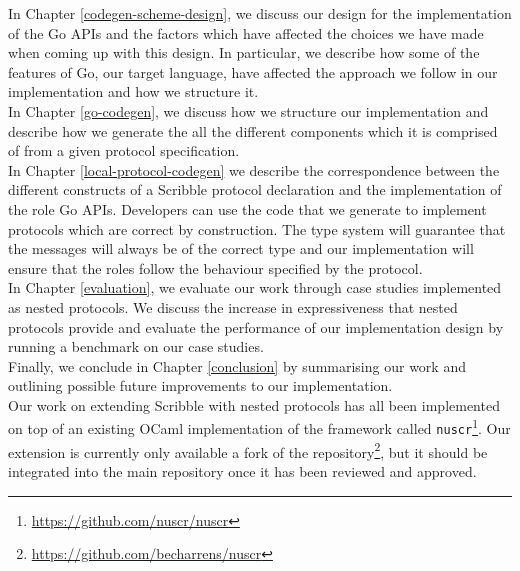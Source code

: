 \documentclass[12pt,twoside]{report}
\begin{document}
In Chapter \ref{codegen-scheme-design}, we discuss our design for the implementation of the Go APIs and the factors which have affected the choices we have made when coming up with this design. In particular, we describe how some of the features of Go, our target language, have affected the approach we follow in our implementation and how we structure it.\\

In Chapter \ref{go-codegen}, we discuss how we structure our implementation and describe how we generate the all the different components which it is comprised of from a given protocol specification.\\

In Chapter \ref{local-protocol-codegen} we describe the correspondence between the different constructs of a Scribble protocol declaration and the implementation of the role Go APIs. Developers can use the code that we generate to implement protocols which are correct by construction. The type system will guarantee that the messages will always be of the correct type and our implementation will ensure that the roles follow the behaviour specified by the protocol.\\

In Chapter \ref{evaluation}, we evaluate our work through case studies implemented as nested protocols. We discuss the increase in expressiveness that nested protocols provide and evaluate the performance of our implementation design by running a benchmark on our case studies.\\

Finally, we conclude in Chapter \ref{conclusion} by summarising our work and outlining possible future improvements to our implementation.\\

Our work on extending Scribble with nested protocols has all been implemented on top of an existing OCaml implementation of the framework called \texttt{nuscr}\footnote{\href{https://github.com/nuscr/nuscr}{https://github.com/nuscr/nuscr}}. Our extension is currently only available a fork of the repository\footnote{\href{https://github.com/becharrens/nuscr}{https://github.com/becharrens/nuscr}}, but it should be integrated into the main repository once it has been reviewed and approved.

\end{document}
